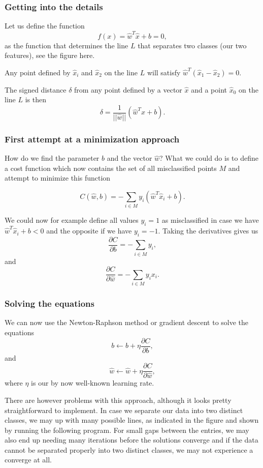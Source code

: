 \documentclass{beamer}
\begin{document}
\begin{frame}
\frametitle{Getting into the details}

Let us define the function
\[
f(x) = \hat{w}^T\hat{x}+b = 0,
\]
as the function that determines the line $L$ that separates two classes (our two features), see the figure here. 


Any point defined by $\hat{x}_i$ and $\hat{x}_2$ on the line $L$ will satisfy $\hat{w}^T(\hat{x}_1-\hat{x}_2)=0$. 

The signed distance $\delta$ from any point defined by a vector $\hat{x}$ and a point $\hat{x}_0$ on the line $L$ is then
\[
\delta = \frac{1}{\vert\vert \hat{w}\vert\vert}(\hat{w}^T\hat{x}+b).
\]
\end{frame}

\begin{frame}
\frametitle{First attempt at a minimization approach}

How do we find the parameter $b$ and the vector $\hat{w}$? What we could
do is to define a cost function which now contains the set of all
misclassified points $M$ and attempt to minimize this function

\[
C(\hat{w},b) = -\sum_{i\in M} y_i(\hat{w}^T\hat{x}_i+b).
\]

We could now for example define all values $y_i =1$ as misclassified in case we have $\hat{w}^T\hat{x}_i+b < 0$ and the opposite if we have $y_i=-1$. Taking the derivatives gives us
\[
\frac{\partial C}{\partial b} = -\sum_{i\in M} y_i,
\]
and 
\[
\frac{\partial C}{\partial \hat{w}} = -\sum_{i\in M} y_ix_i.
\]
\end{frame}

\begin{frame}
\frametitle{Solving the equations}

We can now use the Newton-Raphson method or gradient descent to solve the equations
\[
b \leftarrow b +\eta \frac{\partial C}{\partial b},
\]
and
\[
\hat{w} \leftarrow \hat{w} +\eta \frac{\partial C}{\partial \hat{w}},
\]
where $\eta$ is our by now well-known learning rate. 

There are however problems with this approach, although it looks
pretty straightforward to implement. In case we separate our data into
two distinct classes, we may up with many possible lines, as indicated
in the figure and shown by running the following program. For small
gaps between the entries, we may also end up needing many iterations
before the solutions converge and if the data cannot be separated
properly into two distinct classes, we may not experience a converge
at all.
\end{frame}
\end{document}

